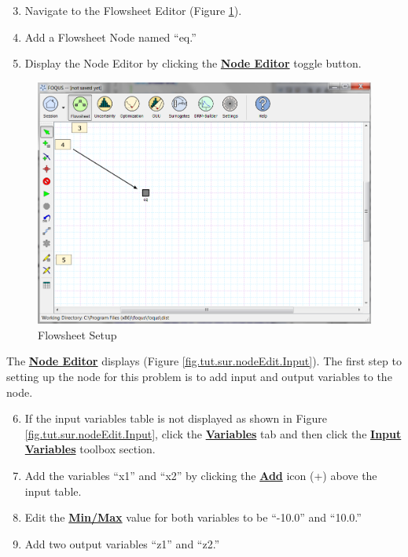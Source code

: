 \begin{enumerate}
	\setcounter{enumi}{2}
	\item Navigate to the Flowsheet Editor (Figure \ref{fig.tut.sur.flowsheet}).
	\item Add a Flowsheet Node named ``eq.''
	\item Display the Node Editor by clicking the \textbf{\underline{Node Editor}} toggle button.
\end{enumerate}
\begin{figure}[H]
	\begin{center}
		\includegraphics[scale=0.55]{Chapt_surrogates/figs/flowsheet}
		\caption{Flowsheet Setup}
		\label{fig.tut.sur.flowsheet}
	\end{center}
\end{figure}
The \textbf{\underline{Node Editor}} displays (Figure \ref{fig.tut.sur.nodeEdit.Input}).  The first step to setting up the node for this problem is to add input and output variables to the node.
\begin{enumerate}
	\setcounter{enumi}{5}
	\item If the input variables table is not displayed as shown in Figure \ref{fig.tut.sur.nodeEdit.Input}, click the \textbf{\underline{Variables}} tab and then click the \textbf{\underline{Input Variables}} toolbox section.
	\item Add the variables ``x1'' and ``x2'' by clicking the \textbf{\underline{Add}} icon (+) above the input table.
	\item Edit the \textbf{\underline{Min/Max}} value for both variables to be ``-10.0'' and ``10.0.''
	\item Add two output variables ``z1'' and ``z2.''
\end{enumerate}
